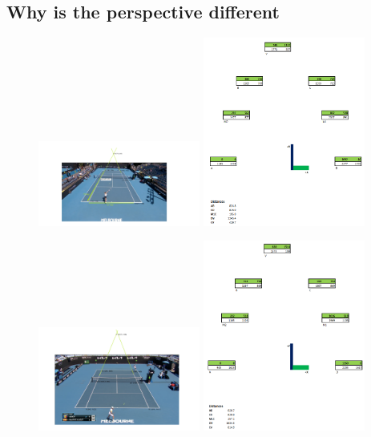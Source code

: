 \documentclass[12pt, oneside]{article}
\begin{document}
\subsection{Why is the perspective different}

\begin{figure}[H]
  \includegraphics[width=0.475\textwidth]{imgs/tennis1}
  \hfill
  \includegraphics[width=0.475\textwidth]{imgs/tennis1_excel}
\end{figure}

\begin{figure}[H]
  \includegraphics[width=0.475\textwidth]{imgs/tennis2}
  \hfill
  \includegraphics[width=0.475\textwidth]{imgs/tennis2_excel}
\end{figure}
\end{document}
